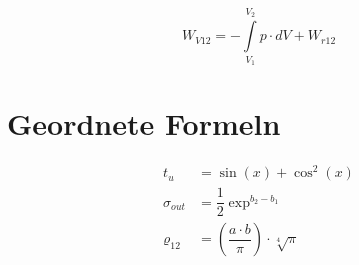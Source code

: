 		\begin{equation}
			W_{V12} = - \int\limits_{V_1}^{V_2} p \cdot dV + W_{r12}
		\end{equation}
	
	\section{Geordnete Formeln}
		
		\begin{align}
			t_u &= \sin(x) + \cos^2(x)\\
			\sigma_{out} &= \dfrac{1}{2} \exp^{b_2 - b_1}\nonumber\\
			\varrho_{12} &= \left(\dfrac{a \cdot b}{\pi}\right) \cdot \sqrt[4]{\pi}
		\end{align}